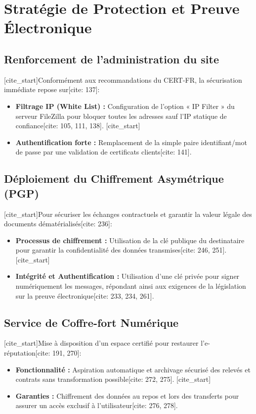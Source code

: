 \documentclass[a4paper,11pt]{article}
\begin{document}
\section{Stratégie de Protection et Preuve Électronique}

\subsection{Renforcement de l'administration du site}
[cite_start]Conformément aux recommandations du CERT-FR, la sécurisation immédiate repose sur[cite: 137]:
\begin{itemize}
    [cite_start]\item \textbf{Filtrage IP (White List) :} Configuration de l'option « IP Filter » du serveur FileZilla pour bloquer toutes les adresses sauf l'IP statique de confiance[cite: 105, 111, 138].
    [cite_start]\item \textbf{Authentification forte :} Remplacement de la simple paire identifiant/mot de passe par une validation de certificats clients[cite: 141].
\end{itemize}

\subsection{Déploiement du Chiffrement Asymétrique (PGP)}
[cite_start]Pour sécuriser les échanges contractuels et garantir la valeur légale des documents dématérialisés[cite: 236]:
\begin{itemize}
    [cite_start]\item \textbf{Processus de chiffrement :} Utilisation de la clé publique du destinataire pour garantir la confidentialité des données transmises[cite: 246, 251].
    [cite_start]\item \textbf{Intégrité et Authentification :} Utilisation d'une clé privée pour signer numériquement les messages, répondant ainsi aux exigences de la législation sur la preuve électronique[cite: 233, 234, 261].
\end{itemize}

\subsection{Service de Coffre-fort Numérique}
[cite_start]Mise à disposition d'un espace certifié pour restaurer l'e-réputation[cite: 191, 270]:
\begin{itemize}
    [cite_start]\item \textbf{Fonctionnalité :} Aspiration automatique et archivage sécurisé des relevés et contrats sans transformation possible[cite: 272, 275].
    [cite_start]\item \textbf{Garanties :} Chiffrement des données au repos et lors des transferts pour assurer un accès exclusif à l'utilisateur[cite: 276, 278].
\end{itemize}
\end{document}
